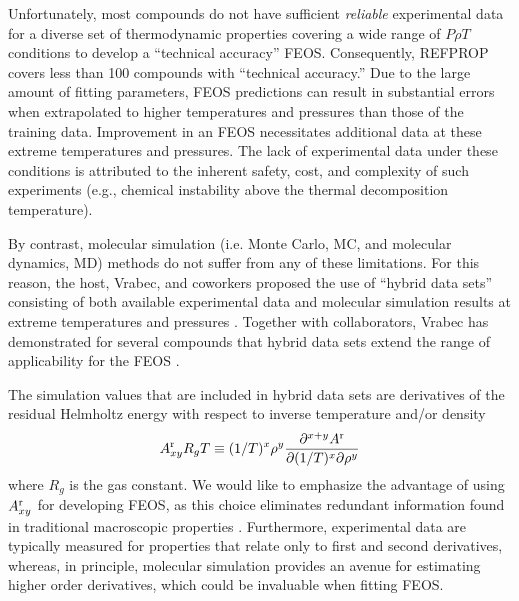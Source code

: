 \documentclass[12pt,a4paper]{article}
\begin{document}

Unfortunately, most compounds do not have sufficient \textit{reliable} experimental data for a diverse set of thermodynamic properties covering a wide range of $P \rho T$ conditions to develop a ``technical accuracy'' FEOS. Consequently, REFPROP covers less than 100 compounds with ``technical accuracy.'' Due to the large amount of fitting parameters, FEOS predictions can result in substantial errors when extrapolated to higher temperatures and pressures than those of the training data. Improvement in an FEOS necessitates additional data at these extreme temperatures and pressures. The lack of experimental data under these conditions is attributed to the inherent safety, cost, and complexity of such experiments (e.g., chemical instability above the thermal decomposition temperature).

By contrast, molecular simulation (i.e. Monte Carlo, MC, and molecular dynamics, MD) methods do not suffer from any of these limitations. For this reason, the host, Vrabec, and coworkers proposed the use of ``hybrid data sets'' consisting of both available experimental data and molecular simulation results at extreme temperatures and pressures  \cite{Rutkai2013}. Together with collaborators, Vrabec has  demonstrated for several compounds that hybrid data sets extend the range of applicability for the FEOS \cite{Thol2016_siloxane_first,Thol2016_siloxane,Thol2017,Rutkai2013,Thol2015}. 

The simulation values that are included in hybrid data sets are derivatives of the residual Helmholtz energy with respect to inverse temperature and/or density
\begin{equation} \label{Residual Derivatives}
A_{xy}^{\rm r} R_gT \equiv (1/T)^x\rho^y \frac{\partial^{x+y}A^{\rm r}}{\partial(1/T)^x \partial \rho^y}
\end{equation}
where $R_g$ is the gas constant. We would like to emphasize the advantage of using $A_{xy}^{\rm r}$ for developing FEOS, as this choice eliminates redundant information found in traditional macroscopic properties \cite{Thol2016_LJ,Thol_LJTS,Rutkai2017,Lustig2015,Rutkai2013,Rutkai2015}. Furthermore, experimental data are typically measured for properties that relate only to first and second derivatives, whereas, in principle, molecular simulation provides an avenue for estimating higher order derivatives, which could be invaluable when fitting FEOS. 
\end{document}
